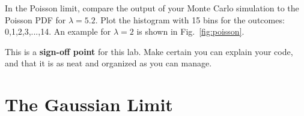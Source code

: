 \begin{plot} In the Poisson limit, compare the output of your Monte Carlo simulation to the Poisson PDF
for $\lambda=5.2$.
Plot the histogram with 15 bins for the outcomes: 0,1,2,3,...,14.  
An example for $\lambda=2$ is shown in Fig.~\ref{fig:poisson}.
\end{plot}


This is a \textbf{sign-off point} for this lab.  Make certain you can
explain your code, and that it is as neat and organized as you can
manage.

\section{The Gaussian Limit}

